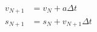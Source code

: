 \documentclass[10pt]{article}
\begin{document}
\begin{align*}v_{N+1}&=v_{N}+a\Delta t \\
s_{N+1}&=s_{N}+v_{N+1}\Delta t\end{align*}
\end{document}
